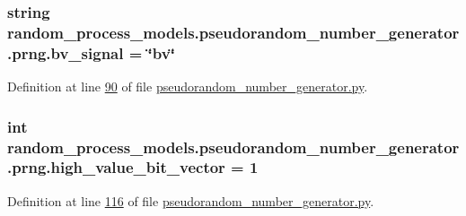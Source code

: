 \subsubsection[{bv\+\_\+signal}]{\setlength{\rightskip}{0pt plus 5cm}string random\+\_\+process\+\_\+models.\+pseudorandom\+\_\+number\+\_\+generator.\+prng.\+bv\+\_\+signal = \char`\"{}bv\char`\"{}\hspace{0.3cm}{\ttfamily [static]}}\label{classrandom__process__models_1_1pseudorandom__number__generator_1_1prng_a82f57253641d85b4e2efba66fac47066}


Definition at line \hyperlink{pseudorandom__number__generator_8py_source_l00090}{90} of file \hyperlink{pseudorandom__number__generator_8py_source}{pseudorandom\+\_\+number\+\_\+generator.\+py}.

\hypertarget{classrandom__process__models_1_1pseudorandom__number__generator_1_1prng_a3ff9b0f7e6c786c43774225d9ae911ce}{}
\subsubsection[{high\+\_\+value\+\_\+bit\+\_\+vector}]{\setlength{\rightskip}{0pt plus 5cm}int random\+\_\+process\+\_\+models.\+pseudorandom\+\_\+number\+\_\+generator.\+prng.\+high\+\_\+value\+\_\+bit\+\_\+vector = 1\hspace{0.3cm}{\ttfamily [static]}}\label{classrandom__process__models_1_1pseudorandom__number__generator_1_1prng_a3ff9b0f7e6c786c43774225d9ae911ce}


Definition at line \hyperlink{pseudorandom__number__generator_8py_source_l00116}{116} of file \hyperlink{pseudorandom__number__generator_8py_source}{pseudorandom\+\_\+number\+\_\+generator.\+py}.

\hypertarget{classrandom__process__models_1_1pseudorandom__number__generator_1_1prng_af12063b0aa05ec3b1cb998eb59af1b39}{}
